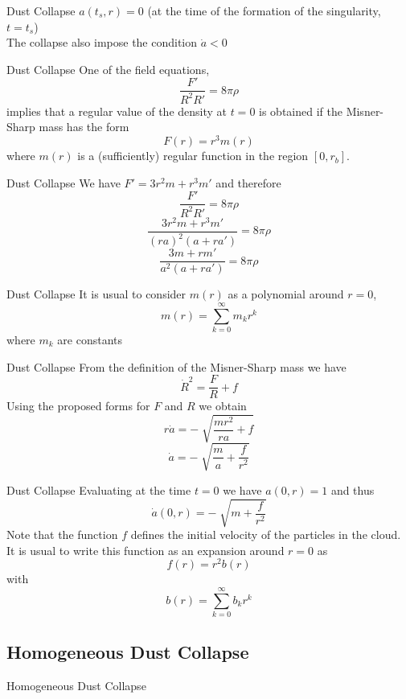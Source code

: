 \documentclass{beamer}
\begin{document}
\begin{darkframes}
\begin{frame}{Dust Collapse}
    $a(t_s,r) = 0$ (at the time of the formation of the singularity, $t=t_s$)\\
    \bigskip
    \pause
    The collapse also impose the condition $\dot{a}<0$ 
\end{frame}

\begin{frame}{Dust Collapse}
    One of the field equations,
    $$\frac{F'}{R^2 R'} = 8\pi \rho$$
    implies that a regular value of the density at $t=0$ is obtained if the Misner-Sharp mass has the form
    $$F(r) = r^3 m(r)$$
    where $m(r)$ is a (sufficiently) regular function in the region $[0,r_b]$.
\end{frame}

\begin{frame}{Dust Collapse}
    We have $F' = 3r^2 m + r^3 m'$ and therefore
    $$\frac{F'}{R^2 R'} = 8\pi \rho$$
    \pause
    $$\frac{3r^2 m + r^3 m'}{(ra)^2 (a+ra')} = 8\pi \rho$$
    \pause
    $$\frac{3m + r m'}{a^2 (a+ra')} = 8\pi \rho$$
\end{frame}

\begin{frame}{Dust Collapse}
    It is usual to consider $m(r)$ as a polynomial around $r=0$,
    $$m(r) = \sum_{k=0} ^\infty m_k r^k$$
    where $m_k$ are constants
\end{frame}

\begin{frame}{Dust Collapse}
    From the definition of the Misner-Sharp mass we have
    $$\dot{R}^2 = \frac{F}{R} + f$$
    \pause
    Using the proposed forms for $F$ and $R$ we obtain
    $$r \dot{a} = - \sqrt[]{\frac{mr^2}{ra}+f}$$
    \pause
    $$\dot{a} = - \sqrt[]{\frac{m}{a}+\frac{f}{r^2}}$$
\end{frame}

\begin{frame}{Dust Collapse}
    Evaluating at the time $t=0$ we have $a(0,r)=1$ and thus
    $$\dot{a}(0,r) = - \sqrt[]{m+\frac{f}{r^2}}$$
    \pause
    Note that the function $f$ defines the initial velocity of the particles in the cloud.
    \pause
    It is usual to write this function as an expansion around $r=0$ as
    $$f(r) = r^2 b(r)$$
    with
    $$ b(r) = \sum_{k=0}^\infty b_k r^k$$
\end{frame}

\subsection{Homogeneous Dust Collapse}
\begin{frame}
	\huge
    {Homogeneous Dust Collapse}
\end{frame}


\end{darkframes}
\end{document}
